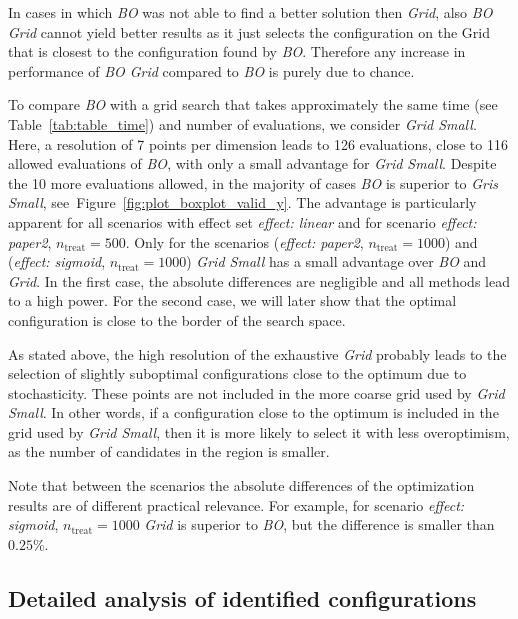 \documentclass[bimj,fleqn]{w-art}
\theoremstyle{plain}
\theoremstyle{definition}
\begin{document}
In cases in which \emph{BO} was not able to find a better solution then \emph{Grid}, also \emph{BO Grid} cannot yield better results as it just selects the configuration on the Grid that is closest to the configuration found by \emph{BO}.
Therefore any increase in performance of \emph{BO Grid} compared to \emph{BO} is purely due to chance.

To compare \emph{BO} with a grid search that takes approximately the same time (see Table~\ref{tab:table_time}) and number of evaluations, we consider \emph{Grid Small}.
Here, a resolution of 7 points per dimension leads to 126 evaluations, close to 116 allowed evaluations of \emph{BO}, with only a small advantage for \emph{Grid Small}.
Despite the 10 more evaluations allowed, in the majority of cases \emph{BO} is superior to \emph{Gris Small}, see~Figure~\ref{fig:plot_boxplot_valid_y}.
The advantage is particularly apparent for all scenarios with effect set \emph{effect: linear} and for scenario \emph{effect: paper2}, $n_{\text{treat}} = 500$.
Only for the scenarios (\emph{effect: paper2}, $n_{\text{treat}} = 1000$) and (\emph{effect: sigmoid}, $n_{\text{treat}} = 1000$) \emph{Grid Small} has a small advantage over \emph{BO} and \emph{Grid}.
In the first case, the absolute differences are negligible and all methods lead to a high power.
For the second case, we will later show that the optimal configuration is close to the border of the search space.

As stated above, the high resolution of the exhaustive \emph{Grid} probably leads to the selection of slightly suboptimal configurations close to the optimum due to stochasticity.
These points are not included in the more coarse grid used by \emph{Grid Small}.
In other words, if a configuration close to the optimum is included in the grid used by \emph{Grid Small}, then it is more likely to select it with less overoptimism, as the number of candidates in the region is smaller.

Note that between the scenarios the absolute differences of the optimization results are of different practical relevance. For example, for scenario \emph{effect: sigmoid}, $n_{\text{treat}} = 1000$ \emph{Grid} is superior to \emph{BO}, but the difference is smaller than $0.25\%$.


\subsection{Detailed analysis of identified configurations}
\end{document}
